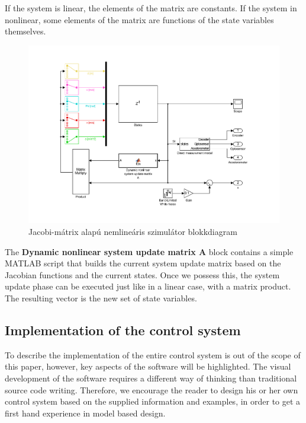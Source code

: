 If the system is linear, the elements of the matrix are constants. If the system in nonlinear, some elements of the matrix are functions of the state variables themselves.

\begin{figure}[!ht]
    \centering
    \includegraphics[width=\linewidth]{img/sys}
    \centering
    \vspace{-30pt}
    \caption{Jacobi-mátrix alapú nemlineáris szimulátor blokkdiagram}
    \label{fig:model}
\end{figure}

The \textbf{Dynamic nonlinear system update matrix A} block contains a simple MATLAB script that builds the current system update matrix based on the Jacobian functions and the current states. Once we possess this, the system update phase can be executed just like in a linear case, with a matrix product. The resulting vector is the new set of state variables.

\subsection{Implementation of the control system}

To describe the implementation of the entire control system is out of the scope of this paper, however, key aspects of the software will be highlighted. The visual development of the software requires a different way of thinking than traditional source code writing. Therefore, we encourage the reader to design his or her own control system based on the supplied information and examples, in order to get a first hand experience in model based design.

